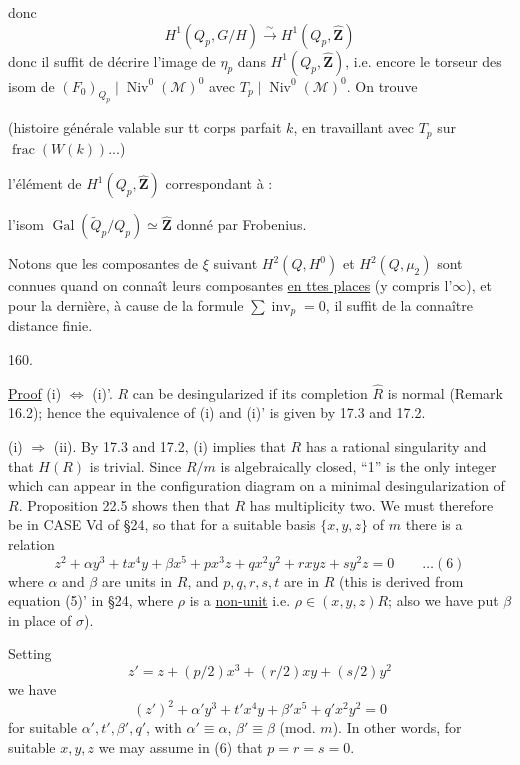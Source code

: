 donc
\[
H^1(Q_p,G/H)\xrightarrow{\sim}H^1(Q_p,\widehat{\mathbf Z})
\]
donc il suffit de décrire l'image de $\eta_p$ dans $H^1(Q_p,\widehat{\mathbf Z})$, i.e. encore le torseur des isom de $(F_0)_{Q_p}\mid\operatorname{Niv}^0(\mathcal M)^0$ avec $T_p\mid\operatorname{Niv}^0(\mathcal M)^0$. On trouve

(histoire générale valable sur tt corps parfait $k$, en travaillant avec  $T_p$ sur  $\operatorname{frac}(W(k))$...)

l'élément de $H^1(Q_p,\widehat{\mathbf Z})$  correspondant à :

l'isom $\operatorname{Gal}(\widetilde Q_p/Q_p)\simeq\widehat{\mathbf Z}$ donné par Frobenius.

Notons que les composantes de $\xi$ suivant $H^2(Q,H^0)$ et $H^2(Q,\mu_2)$ sont connues quand on connaît leurs composantes \uline{en ttes places} (y compris l'$\infty$), et pour la dernière, à cause de la formule $\sum\operatorname{inv}_p=0$, il suffit de la connaître  distance finie.

160.

\uline{Proof} (i) $\Leftrightarrow$ (i)'. $R$ can be desingularized if its completion $\widehat R$ is normal (Remark 16.2); hence the equivalence of (i) and (i)' is given by 17.3 and 17.2.

(i) $\Rightarrow$ (ii). By 17.3 and 17.2, (i) implies that $R$ has a rational singularity and that $H(R)$ is trivial. Since $R/m$ is algebraically closed, ``1'' is the only integer which can appear in the configuration diagram on a minimal desingularization of $R$. Proposition 22.5 shows then that $R$ has multiplicity two. We must therefore be in CASE Vd of \S24, so that for a suitable basis $\{x,y,z\}$ of $m$ there is a relation
\[
z^2+\alpha y^3+tx^4y+\beta x^5+px^3z+qx^2y^2+rxyz+sy^2z=0
\qquad\ldots(6)
\]
where $\alpha$ and $\beta$ are units in $R$, and $p,q,r,s,t$ are in $R$ (this is derived from equation (5)' in \S24, where $\rho$ is a \uline{non-unit} i.e. $\rho\in(x,y,z)R$; also we have put $\beta$ in place of $\sigma$).

Setting
\[
z'=z+(p/2)x^3+(r/2)xy+(s/2)y^2
\]
we have
\[
(z')^2+\alpha'y^3+t'x^4y+\beta'x^5+q'x^2y^2=0
\]
for suitable $\alpha',t',\beta',q'$, with $\alpha'\equiv\alpha$, $\beta'\equiv\beta$ (mod. $m$). In other words, for suitable $x,y,z$ we may assume in (6) that $p=r=s=0$.

